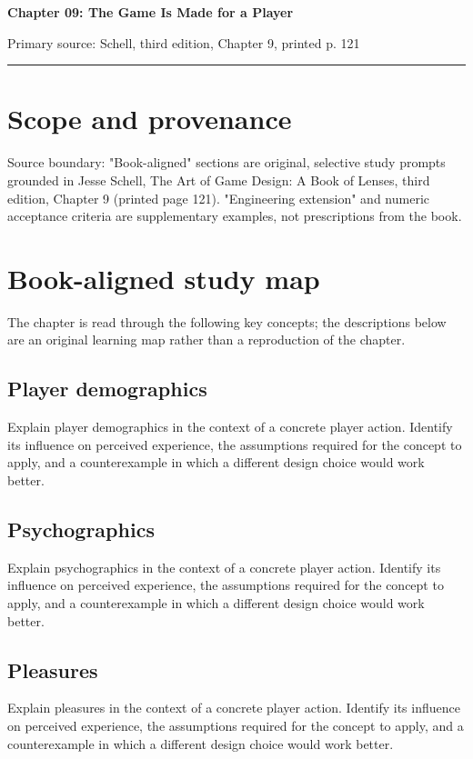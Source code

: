 \documentclass[11pt]{article}
\begin{document}
{\huge\bfseries\color{suiteblue} Chapter 09: The Game Is Made for a Player}\par
\vspace{0.15in}
{\normalsize\color{suitegray} Primary source: Schell, third edition, Chapter 9, printed p. 121}\par
\vspace{0.15in}\hrule\vspace{0.15in}

\section{Scope and provenance}
Source boundary: "Book-aligned" sections are original, selective study prompts grounded in Jesse Schell, The Art of Game Design: A Book of Lenses, third edition, Chapter 9 (printed page 121). "Engineering extension" and numeric acceptance criteria are supplementary examples, not prescriptions from the book.


\section{Book-aligned study map}
The chapter is read through the following key concepts; the descriptions below are an original learning map rather than a reproduction of the chapter.


\subsection{Player demographics}
Explain player demographics in the context of a concrete player action. Identify its influence on perceived experience, the assumptions required for the concept to apply, and a counterexample in which a different design choice would work better.


\subsection{Psychographics}
Explain psychographics in the context of a concrete player action. Identify its influence on perceived experience, the assumptions required for the concept to apply, and a counterexample in which a different design choice would work better.


\subsection{Pleasures}
Explain pleasures in the context of a concrete player action. Identify its influence on perceived experience, the assumptions required for the concept to apply, and a counterexample in which a different design choice would work better.
\end{document}
